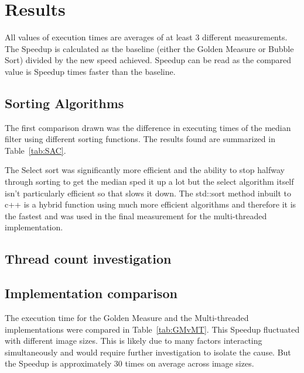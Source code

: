 \section{Results}

All values of execution times are averages of at least 3 different measurements. The Speedup is calculated as the baseline (either the Golden Measure or Bubble Sort) divided by the new speed achieved. Speedup can be read as the compared value is Speedup times faster than the baseline.

\subsection{Sorting Algorithms}

The first comparison drawn was the difference in executing times of the median filter using different sorting functions. The results found are summarized in Table~\ref{tab:SAC}.


The Select sort was significantly more efficient and the ability to stop halfway through sorting to get the median sped it up a lot but the select algorithm itself isn't particularly efficient so that slows it down.
The std::sort method inbuilt to c++ is a hybrid function using much more efficient algorithms and therefore it is the fastest and was used in the final measurement for the multi-threaded implementation. 

\subsection{Thread count investigation}

\subsection{Implementation comparison}

The execution time for the Golden Measure and the Multi-threaded implementations were compared in Table~\ref{tab:GMvMT}. This Speedup fluctuated with different image sizes. This is likely due to many factors interacting simultaneously and would require further investigation to isolate the cause. But the Speedup is approximately 30 times on average across image sizes.

